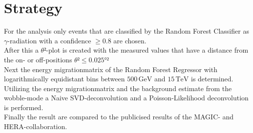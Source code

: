 \section{Strategy}
For the analysis only events that are classified by the Random Forest Classifier as $\gamma$-radiation with a confidence $\geq 0.8$ are chosen. \\
After this a $\theta²$-plot is created with the measured values that have a distance from the on- or off-positions $\theta² \leq 0.025°²$ \\
Next the energy migrationmatrix of the Random Forest Regressor with logarithmically equidistant bins between $500 \, \si{\giga\eV}$ 
and $15 \, \si{\tera\eV}$ is determined. Utilizing the energy migrationmatrix and the background estimate from the wobble-mode 
a Naive SVD-deconvolution and a Poisson-Likelihood deconvolution is performed.\\

Finally the result are compared to the publicised results of the MAGIC- and HERA-collaboration.
